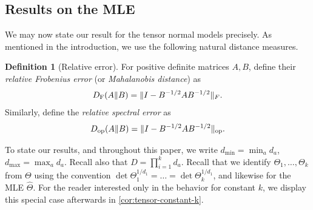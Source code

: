 \documentclass[aos]{imsart}
\theoremstyle{definition}
\newtheorem{definition}[theorem]{Definition}
\numberwithin{equation}{section}
\DeclareMathOperator{\op}{op}
\DeclarePairedDelimiter{\norm}{\lVert}{\rVert}
\newcommand{\htheta}{\widehat{\Theta}}
\newcommand{\ot}{\otimes}
\newcommand{\DF}{D_{\operatorname{F}}}
\newcommand{\Dop}{D_{\operatorname{op}}}
\def\dmin{d_{\min}}
\def\dmax{d_{\max}}
\newcommand{\MW}[1]{{\color{red}[MW: #1]}}
\newcommand{\MW}[1]{{}}
\begin{document}
\subsection{Results on the MLE}\label{subsec:mle-results}
We may now state our result for the tensor normal models precisely.
As mentioned in the introduction, we use the following natural distance measures.

\begin{definition}[Relative error]\label{dfn:relative-error}
For positive definite matrices $A, B$, define their \emph{relative Frobenius error} (or \emph{Mahalanobis distance}) as
\begin{align}\label{eq:def D_F}
  \DF(A \Vert B) = \norm{I - B^{-1/2} A B^{-1/2}}_F.
\end{align}
Similarly, define the \emph{relative spectral error} as
\begin{align}\label{eq:def D_op}
  \Dop(A \Vert B) = \norm{I - B^{-1/2} A B^{-1/2}}_{\op}.
\end{align}
\end{definition}

To state our results, and throughout this paper, we write $\dmin = \min_a d_a$, $\dmax = \max_a d_a$. Recall also that $D = \prod_{i=1}^k d_a$. Recall that we identify $\Theta_1,\dots,\Theta_k$ from $\Theta$ using the convention $\det\Theta_1^{1/d_1}=\dots=\det\Theta_k^{1/d_1}$, and likewise for the MLE $\htheta$. For the reader interested only in the behavior for constant $k$, we display this special case afterwards in \cref{cor:tensor-constant-k}.

\newcommand{\TensorFrob}[2]{%
There is a universal constant~$C>0$ such that the following holds.
Suppose $t \geq 1$ and
\begin{#1}#2
  n \geq C k^2 \frac{\dmax^2}D \max \{ k, \dmax \} t^2.
\end{#1}
Then the MLE~$\htheta = \htheta_1 \ot \cdots \ot \htheta_k$ for $n$ independent samples of the tensor normal model with precision matrix~$\Theta = \Theta_1 \ot \cdots \ot \Theta_k$ satisfies
\begin{align*}
  \DF(\htheta_a\Vert\Theta_a) &= O\left(t \, k^{1/2} \dmax \sqrt{\frac{d_a}{n D}} \right) \quad\text{ for all } a\in[k] \\
\quad\text{and}\quad
  \DF(\htheta\Vert\Theta) &= O\left(t \, k^{3/2} \frac{\dmax}{\sqrt{n}}\right),
\end{align*}
with probability at least
\begin{align*}
  1 - k e^{-\Omega\bigl( t^2 \dmax \bigr)} - k^2 \left( \frac{\sqrt{nD}}{k \dmax} \right)^{-\Omega(\dmin)}.
\end{align*}}
\end{document}
